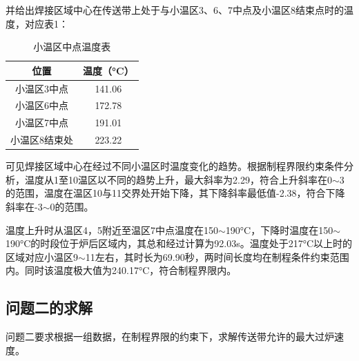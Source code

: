 \documentclass[a4paper,12pt]{ctexart} %
\begin{document}
	并给出焊接区域中心在传送带上处于与小温区3、6、7中点及小温区8结束点时的温度，对应表1：
	\begin{table}[h]
	\centering
	\caption{小温区中点温度表}
	\begin{tabular}{cc}
		\toprule
		位置& 温度（°C）\\ \midrule
		小温区3中点&141.06\\
		小温区6中点&172.78\\
		小温区7中点&191.01\\
		小温区8结束处&223.22\\
		\bottomrule 
	\end{tabular}
	\end{table}\par
	可见焊接区域中心在经过不同小温区时温度变化的趋势。根据制程界限约束条件分析，温度从1至10温区以不同的趋势上升，最大斜率为2.29，符合上升斜率在0$\sim$3的范围，温度在温区10与11交界处开始下降，其下降斜率最低值-2.38，符合下降斜率在-3$\sim$0的范围。\par
	温度上升时从温区4，5附近至温区7中点温度在150$\sim$190°C，下降时温度在150$\sim$190°C的时段位于炉后区域内，其总和经过计算为92.03s。温度处于217°C以上时的区域对应小温区9$\sim$11左右，其时长为69.90秒，两时间长度均在制程条件约束范围内。同时该温度极大值为240.17°C，符合制程界限内。\par
	
	\subsection{问题二的求解}
	问题二要求根据一组数据，在制程界限的约束下，求解传送带允许的最大过炉速度。\par
\end{document}
